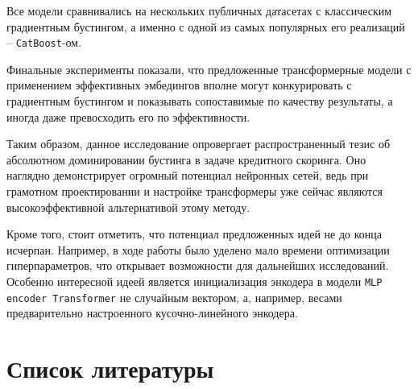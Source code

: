 \documentclass[12pt]{article}
\begin{document}
Все модели сравнивались на нескольких публичных датасетах с классическим градиентным бустингом, а именно с одной из самых популярных его реализаций -- \texttt{CatBoost}-ом.

Финальные эксперименты показали, что предложенные трансформерные модели с применением эффективных эмбедингов вполне могут конкурировать с градиентным бустингом и показывать сопоставимые по качеству результаты, а иногда даже превосходить его по эффективности.

Таким образом, данное исследование опровергает распространенный тезис об абсолютном доминировании бустинга в задаче кредитного скоринга. Оно наглядно демонстрирует огромный потенциал нейронных сетей, ведь при грамотном проектировании и настройке трансформеры уже сейчас являются высокоэффективной альтернативой этому методу.

Кроме того, стоит отметить, что потенциал предложенных идей не до конца исчерпан. Например, в ходе работы было уделено мало времени оптимизации гиперпараметров, что открывает возможности для дальнейших исследований. Особенно интересной идеей является инициализация энкодера в модели \texttt{MLP encoder Transformer} не случайным вектором, а, например, весами предварительно настроенного кусочно-линейного энкодера.


\newpage

\section*{Список литературы}
\end{document}
